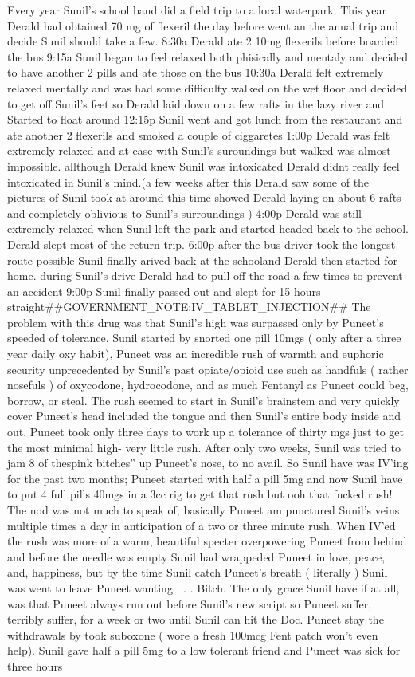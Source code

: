 \documentclass[12pt]{book}
\begin{document}
Every year Sunil's school band did a field trip to a local waterpark. This year Derald had obtained 70 mg of flexeril the day before went an the anual trip and decide Sunil should take a few. 8:30a Derald ate 2 10mg flexerils before boarded the bus 9:15a Sunil began to feel relaxed both phisically and mentaly and decided to have another 2 pills and ate those on the bus 10:30a Derald felt extremely relaxed mentally and was had some difficulty walked on the wet floor and decided to get off Sunil's feet so Derald laid down on a few rafts in the lazy river and Started to float around 12:15p Sunil went and got lunch from the restaurant and ate another 2 flexerils and smoked a couple of ciggaretes 1:00p Derald was felt extremely relaxed and at ease with Sunil's suroundings but walked was almost impossible. allthough Derald knew Sunil was intoxicated Derald didnt really feel intoxicated in Sunil's mind.(a few weeks after this Derald saw some of the pictures of Sunil took at around this time showed Derald laying on about 6 rafts and completely oblivious to Sunil's surroundings ) 4:00p Derald was still extremely relaxed when Sunil left the park and started headed back to the school. Derald slept most of the return trip. 6:00p after the bus driver took the longest route possible Sunil finally arived back at the schooland Derald then started for home. during Sunil's drive Derald had to pull off the road a few times to prevent an accident 9:00p Sunil finally passed out and slept for 15 hours straight\#\#GOVERNMENT\_NOTE:IV\_TABLET\_INJECTION\#\# The problem with this drug was that Sunil's high was surpassed only by Puneet's speeded of tolerance. Sunil started by snorted one pill 10mgs ( only after a three year daily oxy habit), Puneet was an incredible rush of warmth and euphoric security unprecedented by Sunil's past opiate/opioid use such as handfuls ( rather nosefuls ) of oxycodone, hydrocodone, and as much Fentanyl as Puneet could beg, borrow, or steal. The rush seemed to start in Sunil's brainstem and very quickly cover Puneet's head included the tongue and then Sunil's entire body inside and out. Puneet took only three days to work up a tolerance of thirty mgs just to get the most minimal high- very little rush. After only two weeks, Sunil was tried to jam 8 of thespink bitches'' up Puneet's nose, to no avail. So Sunil have was IV'ing for the past two months; Puneet started with half a pill 5mg and now Sunil have to put 4 full pills 40mgs in a 3cc rig to get that rush but ooh that fucked rush! The nod was not much to speak of; basically Puneet am punctured Sunil's veins multiple times a day in anticipation of a two or three minute rush. When IV'ed the rush was more of a warm, beautiful specter overpowering Puneet from behind and before the needle was empty Sunil had wrappeded Puneet in love, peace, and, happiness, but by the time Sunil catch Puneet's breath ( literally ) Sunil was went to leave Puneet wanting . . .  Bitch. The only grace Sunil have if at all, was that Puneet always run out before Sunil's new script so Puneet suffer, terribly suffer, for a week or two until Sunil can hit the Doc. Puneet stay the withdrawals by took suboxone ( wore a fresh 100mcg Fent patch won't even help). Sunil gave half a pill 5mg to a low tolerant friend and Puneet was sick for three hours 
\end{document}
